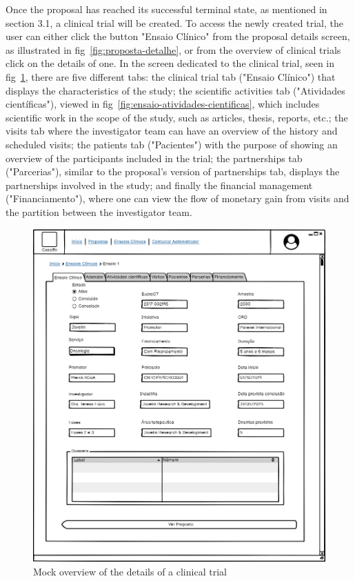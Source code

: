 Once the proposal has reached its successful terminal state, as mentioned in section 3.1, a clinical trial will be created. To access the newly created trial, the user can either click the button "Ensaio Clínico" from the proposal details screen, as illustrated in fig~\ref{fig:proposta-detalhe}, or from the overview of clinical trials click on the details of one.  
In the screen dedicated to the clinical trial, seen in fig~\ref{fig:enasio-detalhe}, there are five different tabs: the clinical trial tab ("Ensaio Clínico") that displays the characteristics of the study; the scientific activities tab ("Atividades científicas"), viewed in fig~\ref{fig:ensaio-atividades-cientificas}, which includes scientific work in the scope of the study, such as articles, thesis, reports, etc.; the visits tab where the investigator team can have an overview of the history and scheduled visits; the patients tab ("Pacientes") with the purpose of showing an overview of the participants included in the trial; the partnerships tab ("Parcerias"), similar to the proposal's version of partnerships tab, displays the partnerships involved in the study; and finally the financial management ("Financiamento"), where one can view the flow of monetary gain from visits and the partition between the investigator team.

\begin{figure}[H]
    \centering
    \includegraphics[scale=0.35]{images/ensaio-detalhe.png}
    \caption{Mock overview of the details of a clinical trial}
    \label{fig:enasio-detalhe}
\end{figure}


